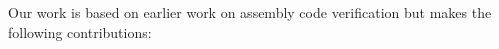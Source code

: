 
Our work is based on earlier work on assembly code
verification but makes the following contributions:



